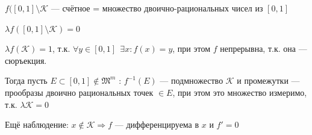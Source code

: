\begin{example}
    \(f([0, 1]\setminus \mathcal{K}\) --- счётное = множество двоично-рациональных чисел из \([0, 1]\)

    \(\lambda f([0, 1]\setminus \mathcal{K}) = 0\)

    \(\lambda f(\mathcal{K}) = 1\), т.к. \(\forall y\in [0, 1] \ \ \exists x : f(x) = y\), при этом \(f\) непрерывна, т.к. она --- сюръекция.

    Тогда пусть \(E\subset [0, 1]\not\in \mathfrak{M}^m\) : \(f^{ - 1}(E)\) --- подмножество \(\mathcal{K}\) и промежутки --- прообразы двоично рациональных точек \(\in E\), при этом это множество измеримо, т.к. \(\lambda \mathcal{K} = 0\)

    Ещё наблюдение: \(x\not\in \mathcal{K} \Rightarrow f\) --- дифференцируема в \(x\) и \(f' = 0\)
\end{example}

